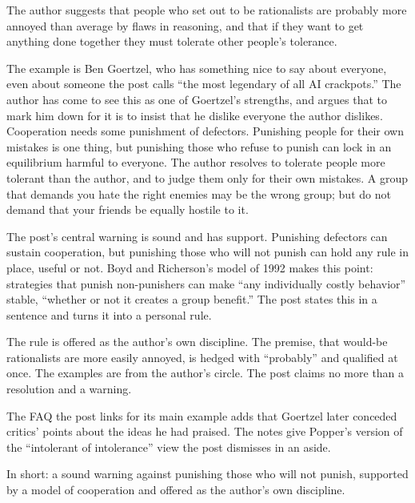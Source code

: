 \begin{afterword}
\summaryhead

The author suggests that people who set out to be rationalists are probably more annoyed than average by flaws in reasoning, and that if they want to get anything done together they must tolerate other people's tolerance.

The example is Ben Goertzel, who has something nice to say about everyone, even about someone the post calls ``the most legendary of all AI crackpots.'' The author has come to see this as one of Goertzel's strengths, and argues that to mark him down for it is to insist that he dislike everyone the author dislikes. Cooperation needs some punishment of defectors. Punishing people for their own mistakes is one thing, but punishing those who refuse to punish can lock in an equilibrium harmful to everyone. The author resolves to tolerate people more tolerant than the author, and to judge them only for their own mistakes. A group that demands you hate the right enemies may be the wrong group; but do not demand that your friends be equally hostile to it.

\responsehead

The post's central warning is sound and has support. Punishing defectors can sustain cooperation, but punishing those who will not punish can hold any rule in place, useful or not. Boyd and Richerson's model of 1992 makes this point: strategies that punish non-punishers can make ``any individually costly behavior'' stable, ``whether or not it creates a group benefit.'' The post states this in a sentence and turns it into a personal rule.

The rule is offered as the author's own discipline. The premise, that would-be rationalists are more easily annoyed, is hedged with ``probably'' and qualified at once. The examples are from the author's circle. The post claims no more than a resolution and a warning.

The FAQ the post links for its main example adds that Goertzel later conceded critics' points about the ideas he had praised. The notes give Popper's version of the ``intolerant of intolerance'' view the post dismisses in an aside.

In short: a sound warning against punishing those who will not punish, supported by a model of cooperation and offered as the author's own discipline.
\end{afterword}
